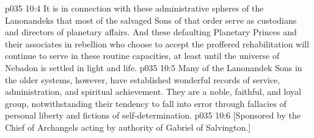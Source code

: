 \vs p035 10:4 \pc It is in connection with these administrative spheres of the Lanonandeks that most of the salvaged Sons of that order serve as custodians and directors of planetary affairs. And these defaulting Planetary Princes and their associates in rebellion who choose to accept the proffered rehabilitation will continue to serve in these routine capacities, at least until the universe of Nebadon is settled in light and life.
\vs p035 10:5 \pc Many of the Lanonandek Sons in the older systems, however, have established wonderful records of service, administration, and spiritual achievement. They are a noble, faithful, and loyal group, notwithstanding their tendency to fall into error through fallacies of personal liberty and fictions of self\hyp{}determination.
\vsetoff
\vs p035 10:6 [Sponsored by the Chief of Archangels acting by authority of Gabriel of Salvington.]
